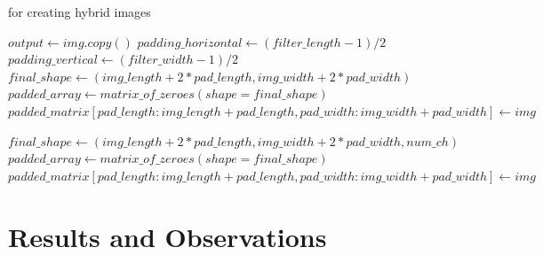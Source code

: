 \documentclass{bmvc2k}
\begin{document}
\begin{algorithm}[H]
	\caption {for creating hybrid images}
   \begin{algorithmic}[1]

      
        \State $ output \gets img.copy() $
        \State $ padding\_horizontal \gets (filter\_length -1 )/2 $
      \State $ padding\_vertical \gets (filter\_width -1)/2 $
      \State $ final\_shape \gets (img\_length + 2*pad\_length, img\_width + 2*pad\_width)$
      \State $  padded\_array \gets matrix\_of\_zeroes(shape=final\_shape)  $
      \State $  padded\_matrix[pad\_length : img\_length + pad\_length, pad\_width : img\_width + pad\_width] \gets img  $
      
          \EndFor
        \EndFor
      

      \Else

      \State $ final\_shape \gets (img\_length + 2*pad\_length, img\_width + 2*pad\_width, num\_ch)$
      \State $  padded\_array \gets matrix\_of\_zeroes(shape=final\_shape)  $
      \State $  padded\_matrix[pad\_length : img\_length + pad\_length, pad\_width : img\_width + pad\_width] \gets img  $
          \EndFor
        \EndFor
      \EndFor
        \EndIf

      \Else 
    
      
      \EndIf

    
    

  \end{algorithmic}
  

\end{algorithm}

\section{Results and Observations}
\label{sec:Results}
\end{document}
